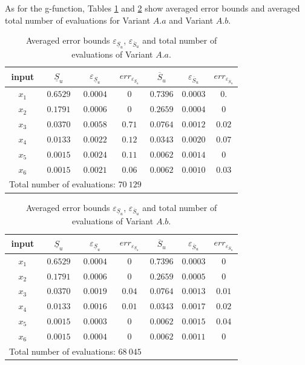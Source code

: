 As for the g-function, Tables \ref{res.bratley.Aa} and \ref{res.bratley.Ab} show averaged error bounds and averaged total number of evaluations for Variant $A.a$ and Variant $A.b$.
\begin{table}[!ht]
\caption{Averaged error bounds $\varepsilon_{\underline{S}_u}$, $\varepsilon_{\overline{S}_u}$ and total number of evaluations of Variant $A.a$.}
\centering
\begin{tabular}{ccccccc}
\hline
 input & $\underline{S}_u$ & $\varepsilon_{\underline{S}_u}$ & ${err}_{\varepsilon_{\underline{S}_u}}$ & $\overline{S}_u$ & $\varepsilon_{\overline{S}_u}$ &$err_{\varepsilon_{\overline{S}_u}}$ \\ \hline
 $x_1$ & $0.6529$ &  $0.0004$ & $0$ & $0.7396$ & $0.0003$ & $0.$ \\ \hline
 $x_2$ & $0.1791$ &  $0.0006$ & $0$ & $0.2659$ & $0.0004$ & $0$ \\ \hline
 $x_3$ & $0.0370$ &  $0.0058$ & $0.71$ & $0.0764$ & $0.0012$ & $0.02$ \\ \hline
 $x_4$ & $0.0133$ &  $0.0022$ & $0.12$ & $0.0343$ & $0.0020$ & $0.07$ \\ \hline
 $x_5$ & $0.0015$ &  $0.0024$ & $0.11$ & $0.0062$ & $0.0014$ & $0$ \\ \hline
 $x_6$ & $0.0015$ & $0.0021$ & $0.06$  & $0.0062$ & $0.0010$ & $0.03$ \\ \hline \hline
\multicolumn{4}{l}{Total number of evaluations: $70 \ 129$} & & &\\ \hline 
\end{tabular}
\label{res.bratley.Aa}
\end{table}
\begin{table}[!ht]
\caption{Averaged error bounds $\varepsilon_{\underline{S}_u}$, $\varepsilon_{\overline{S}_u}$ and total number of evaluations of Variant $A.b$.}
\centering
\begin{tabular}{ccccccc}
\hline
 input & $\underline{S}_u$ & $\varepsilon_{\underline{S}_u}$ & ${err}_{\varepsilon_{\underline{S}_u}}$ & $\overline{S}_u$ & $\varepsilon_{\overline{S}_u}$ &$err_{\varepsilon_{\overline{S}_u}}$ \\ \hline
 $x_1$ & $0.6529$ &  $0.0004$ & $0$ & $0.7396$ & $0.0003$ & $0$ \\ \hline
 $x_2$ & $0.1791$ &  $0.0006$ & $0$ & $0.2659$ & $0.0005$ & $0$ \\ \hline
 $x_3$ & $0.0370$ &  $0.0019$ & $0.04$ & $0.0764$ & $0.0013$ & $0.01$ \\ \hline
 $x_4$ & $0.0133$ &  $0.0016$ & $0.01$ & $0.0343$ & $0.0017$ & $0.02$ \\ \hline
 $x_5$ & $0.0015$ &  $0.0003$ & $0$ & $0.0062$ & $0.0015$ & $0.04$ \\ \hline
 $x_6$ & $0.0015$ &  $0.0004$ & $0$  & $0.0062$ & $0.0011$ & $0$ \\ \hline \hline
\multicolumn{4}{l}{Total number of evaluations: $68 \ 045$} & & &\\ \hline 
\end{tabular}
\label{res.bratley.Ab}
\end{table}

